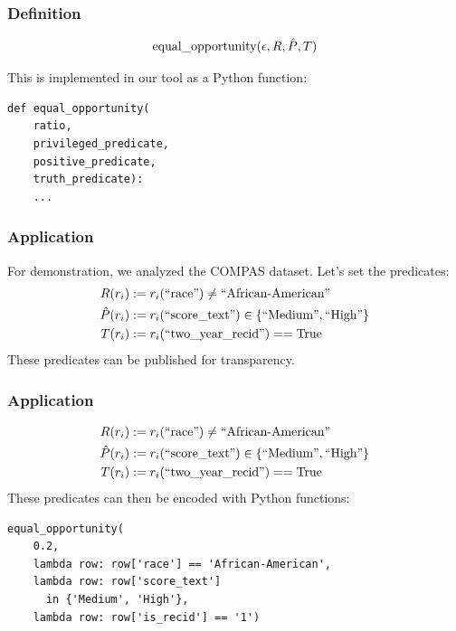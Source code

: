 \documentclass{beamer}
\DeclarePairedDelimiter{\set}{\{}{\}}
\begin{document}
\begin{frame}[fragile]
    \frametitle{Definition}
    \begin{align*}
        \text{equal\_opportunity} (\epsilon, R, \hat{P}, T)
    \end{align*}

    This is implemented in our tool as a Python function:

    \begin{center}
    \begin{minipage}{0.8\textwidth}
    \begin{verbatim}
def equal_opportunity(
    ratio,
    privileged_predicate,
    positive_predicate,
    truth_predicate):
    ...
    \end{verbatim}
    \end{minipage}
    \end{center}
\end{frame}

\begin{frame}
    \frametitle{Application}
    For demonstration, we analyzed the COMPAS dataset.
    Let's set the predicates:
    \begin{align*}
        \priv(r_i) & := r_i(\text{``race''}) \neq \text{``African-American''}\\
        \pos(r_i)  & := r_i(\text{``score\_text''}) \in \set{\text{``Medium''},\text{``High''}}\\
        \tru(r_i)  & := r_i(\text{``two\_year\_recid''}) == \text{True}
    \end{align*}
    These predicates can be published for transparency.
\end{frame}

\begin{frame}[fragile]
    \frametitle{Application}
    \begin{align*}
        \priv(r_i) & := r_i(\text{``race''}) \neq \text{``African-American''}\\
        \pos(r_i)  & := r_i(\text{``score\_text''}) \in \set{\text{``Medium''},\text{``High''}}\\
        \tru(r_i)  & := r_i(\text{``two\_year\_recid''}) == \text{True}
    \end{align*}
    These predicates can then be encoded with Python functions:
    \begin{center}
    \begin{minipage}{0.8\textwidth}
    \begin{verbatim}
equal_opportunity(
    0.2,
    lambda row: row['race'] == 'African-American',
    lambda row: row['score_text']
      in {'Medium', 'High'},
    lambda row: row['is_recid'] == '1')
    \end{verbatim}
    \end{minipage}
    \end{center}
\end{frame}
\end{document}
